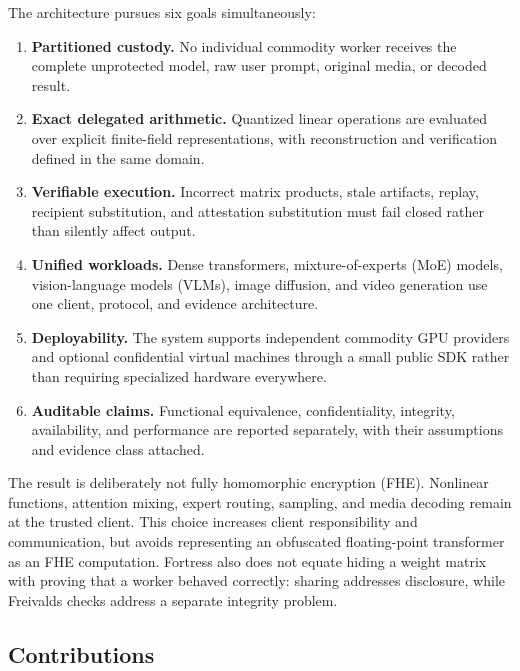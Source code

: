 The architecture pursues six goals simultaneously:
\begin{enumerate}
  \item \textbf{Partitioned custody.} No individual commodity worker receives the complete unprotected model, raw user prompt, original media, or decoded result.
  \item \textbf{Exact delegated arithmetic.} Quantized linear operations are evaluated over explicit finite-field representations, with reconstruction and verification defined in the same domain.
  \item \textbf{Verifiable execution.} Incorrect matrix products, stale artifacts, replay, recipient substitution, and attestation substitution must fail closed rather than silently affect output.
  \item \textbf{Unified workloads.} Dense transformers, mixture-of-experts (MoE) models, vision-language models (VLMs), image diffusion, and video generation use one client, protocol, and evidence architecture.
  \item \textbf{Deployability.} The system supports independent commodity GPU providers and optional confidential virtual machines through a small public SDK rather than requiring specialized hardware everywhere.
  \item \textbf{Auditable claims.} Functional equivalence, confidentiality, integrity, availability, and performance are reported separately, with their assumptions and evidence class attached.
\end{enumerate}

The result is deliberately not fully homomorphic encryption (FHE). Nonlinear functions, attention mixing, expert routing, sampling, and media decoding remain at the trusted client. This choice increases client responsibility and communication, but avoids representing an obfuscated floating-point transformer as an FHE computation. Fortress also does not equate hiding a weight matrix with proving that a worker behaved correctly: sharing addresses disclosure, while Freivalds checks address a separate integrity problem.

\subsection{Contributions}

